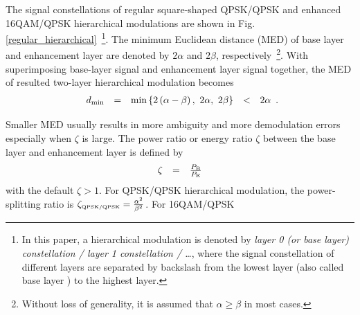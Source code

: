 \documentclass[conference]{IEEEtran}
\begin{document}
The signal constellations of regular square-shaped QPSK/QPSK and
enhanced 16QAM/QPSK hierarchical modulations are shown in Fig.
\ref{regular_hierarchical}~\footnote{In this paper, a hierarchical
modulation is denoted by {\em layer 0 (or base layer)
constellation / layer 1 constellation / \ldots}, where the signal
constellation of different layers are separated by backslash from
the lowest layer (also called base layer ) to the highest layer.}.
The minimum Euclidean distance (MED) of base layer and enhancement
layer are denoted by $2\alpha$ and $2\beta$,
respectively~\footnote{Without loss of generality, it is assumed
that $\alpha\geq\beta$ in most cases.}. With superimposing
base-layer signal and enhancement layer signal together, the MED
of resulted two-layer hierarchical modulation becomes
\begin{equation}
\begin{array}{rcccl}
d_{\rm min}& = & \min\left\{2\left(\alpha-\beta\right),\ 2\alpha,\
2\beta\right\}&<& 2\alpha
\end{array}.\label{Regular_MED}
\end{equation}
\begin{figure}
\end{figure}
\noindent Smaller MED usually results in more ambiguity and more
demodulation errors especially when $\zeta$ is large. The power
ratio or energy ratio $\zeta$ between the base layer and
enhancement layer is defined by
\begin{equation}
\begin{array}{rcl}
\zeta & = & \frac{P_{\mbox{\tiny B}}}{P_{\mbox{\tiny E}}}
\end{array}\label{power_ratio}
\end{equation}
\noindent with the default $\zeta > 1$. For QPSK/QPSK hierarchical
modulation, the power-splitting ratio is $\zeta_{\mbox{\tiny
QPSK/QPSK}}= \frac{\alpha^{2}}{\beta^{2}}$. For 16QAM/QPSK
\end{document}

